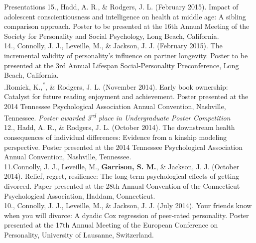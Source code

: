 \documentclass {resume}
\newcommand{\meb}{{\bf Garrison, S. M.}\xspace}
\newcommand{\student}{\hspace{-3.95pt}\textsuperscript{*}\hspace* {2 pt}}
\begin{document}
\begin{rSection}{\textrm{Presentations}}
15.\hspace* {1mm}\meb, Hadd, A. R., \& Rodgers, J. L. (February 2015). Impact of adolescent conscientiousness and \hspace* {6 mm}intelligence on health at middle age: A sibling comparison approach. Poster to be presented at the 16th Annual \hspace* {6 mm}Meeting of the Society for Personality and  Social Psychology, Long Beach, California.\smallskip\\%
14.\hspace* {1mm}\meb, Connolly, J. J., Leveille, M., \& Jackson, J. J. (February 2015). The incremental validity of \hspace* {6 mm}personality's influence on partner longevity. Poster to be presented at the 3rd Annual Lifespan Social-Personality \hspace* {6 mm}Preconference, Long Beach, California.\smallskip\\.\hspace* {1mm}Romick, K.,\student \meb, \& Rodgers, J. L. (November 2014). Early book ownership: Catalyst for future \hspace* {6 mm}reading enjoyment and achievement. Poster presented at the 2014 Tennessee Psychological Association Annual \hspace* {6 mm}Convention, Nashville, Tennessee. \textit{Poster awarded 3\textsuperscript{rd} place in Undergraduate Poster Competition}\smallskip\\%
12.\hspace* {1mm}\meb, Hadd, A. R., \& Rodgers, J. L. (October 2014). The downstream health consequences of \hspace* {6 mm}individual differences: Evidence from a kinship modeling perspective. Poster presented at the 2014 Tennessee \hspace* {6 mm}Psychological Association Annual Convention, Nashville, Tennessee.\smallskip\\
11.\hspace* {1mm}Connolly, J. J., Leveille, M., \meb, \& Jackson, J. J. (October 2014). Relief,  regret,  resilience: The  \hspace* {6 mm}long-term  psychological  effects  of  getting divorced. Paper presented at the 28th Annual Convention of the \hspace* {6 mm}Connecticut Psychological Association, Haddam, Connecticut.%
\smallskip\\
10.\hspace* {1mm}\meb, Connolly, J. J., Leveille, M., \& Jackson, J. J. (July 2014). Your friends know when you will \hspace* {6 mm}divorce: A dyadic Cox regression of peer-rated personality. Poster presented at the 17th Annual Meeting of the \hspace* {6 mm}European Conference on Personality, University of Lausanne, Switzerland.
\smallskip\\

\end{rSection}
\end{document}
